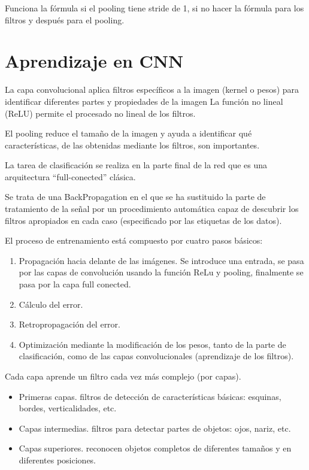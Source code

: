 \documentclass[12pt, twoside, openright]{report} %
\begin{document}
Funciona la fórmula si el pooling tiene stride de 1, si no hacer la fórmula para los filtros y después para el pooling.

\section{Aprendizaje en CNN}
La capa convolucional aplica filtros específicos a la imagen (kernel o pesos) para identificar diferentes partes y propiedades de la imagen
La función no lineal (ReLU) permite el procesado no lineal de los filtros.

El pooling reduce el tamaño de la imagen y ayuda a identificar qué características, de las obtenidas mediante los filtros, son importantes.

La tarea de clasificación se realiza en la parte final de la red que es una arquitectura “full-conected” clásica.

Se trata de una BackPropagation en el que se ha sustituido la parte de tratamiento de la señal por un procedimiento automática capaz de descubrir los filtros apropiados en cada caso (especificado por las etiquetas de los datos).

El proceso de entrenamiento está compuesto por cuatro pasos básicos:
\begin{enumerate}
	\item Propagación hacia delante de las imágenes. Se introduce una entrada, se pasa por las capas de convolución usando la función ReLu y pooling, finalmente se pasa por la capa full conected.
	\item Cálculo del error.
	\item Retropropagación del error.
	\item Optimización mediante la modificación de los pesos, tanto de la parte de clasificación, como de las capas convolucionales (aprendizaje de los filtros).
\end{enumerate}
Cada capa aprende un filtro cada vez más complejo (por capas).
\begin{itemize}
	\item Primeras capas. filtros de detección de características básicas: esquinas, bordes, verticalidades, etc.
	\item Capas intermedias. filtros para detectar partes de objetos: ojos, nariz, etc.
	\item Capas superiores. reconocen objetos completos de diferentes tamaños y en diferentes posiciones.
\end{itemize}
\end{document}
